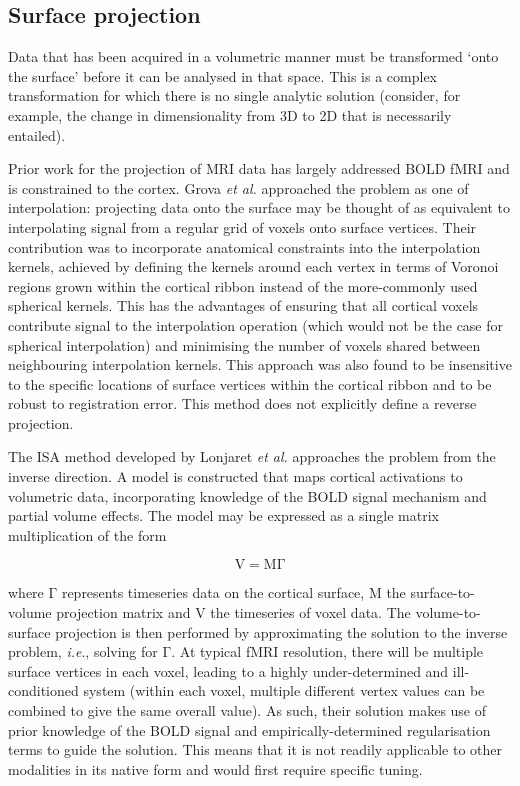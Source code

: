\documentclass[12pt]{report}
\newcommand{\mat}[1]{\mathrm{#1}}
\begin{document}
 
\subsection{Surface projection}
\label{lit_projection_methods}

Data that has been acquired in a volumetric manner must be transformed `onto the surface' before it can be analysed in that space. This is a complex transformation for which there is no single analytic solution (consider, for example, the change in dimensionality from 3D to 2D that is necessarily entailed). 

Prior work for the projection of MRI data has largely addressed BOLD fMRI and is constrained to the cortex. Grova \textit{et al.} \cite{Grova2006} approached the problem as one of interpolation: projecting data onto the surface may be thought of as equivalent to interpolating signal from a regular grid of voxels onto surface vertices. Their contribution was to incorporate anatomical constraints into the interpolation kernels, achieved by defining the kernels around each vertex in terms of Voronoi regions grown within the cortical ribbon instead of the more-commonly used spherical kernels. This has the advantages of ensuring that all cortical voxels contribute signal to the interpolation operation (which would not be the case for spherical interpolation) and minimising the number of voxels shared between neighbouring interpolation kernels. This approach was also found to be insensitive to the specific locations of surface vertices within the cortical ribbon and to be robust to registration error. This method does not explicitly define a reverse projection. 

The ISA method developed by Lonjaret \textit{et al.} \cite{Lonjaret2017} approaches the problem from the inverse direction. A model is constructed that maps cortical activations to volumetric data, incorporating knowledge of the BOLD signal mechanism and partial volume effects. The model may be expressed as a single matrix multiplication of the form 

\begin{equation}
\mat{V = M \Gamma}
\end{equation}

where $\mat{\Gamma}$ represents timeseries data on the cortical surface, $\mat{M}$ the surface-to-volume projection matrix and $\mat{V}$ the timeseries of voxel data. The volume-to-surface projection is then performed by approximating the solution to the inverse problem, \textit{i.e}., solving for $\mat{\Gamma}$. At typical fMRI resolution, there will be multiple surface vertices in each voxel, leading to a highly under-determined and ill-conditioned system (within each voxel, multiple different vertex values can be combined to give the same overall value). As such, their solution makes use of prior knowledge of the BOLD signal and empirically-determined regularisation terms to guide the solution. This means that it is not readily applicable to other modalities in its native form and would first require specific tuning. 
\end{document}
